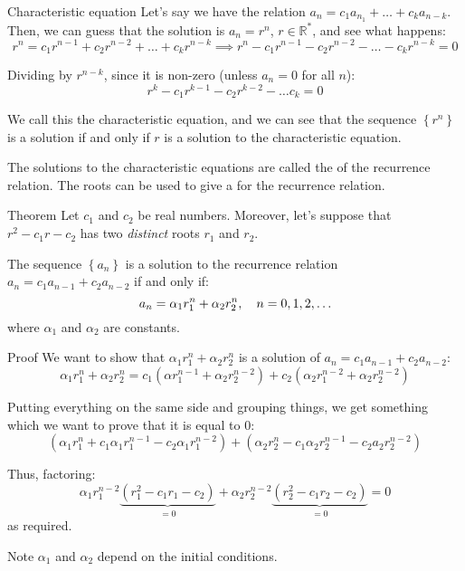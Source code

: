 \documentclass[a4paper]{article}
\begin{document}
\begin{parag}{Characteristic equation}
    Let's say we have the relation $a_n = c_1 a_{n_1} + \ldots + c_k a_{n-k}$. Then, we can guess that the solution is $a_n = r^{n}$, $r \in \mathbb{R}^*$, and see what happens: 
    \[r^{n} = c_1 r^{n-1} + c_2 r^{n-2} + \ldots + c_k r^{n-k} \implies r^{n} - c_1 r^{n-1} - c_2 r^{n-2} - \ldots - c_k r^{n-k} = 0\]

    Dividing by $r^{n-k}$, since it is non-zero (unless $a_n = 0$ for all $n$): 
    \[r^k - c_1 r^{k-1} - c_2 r^{k-2} - \ldots c_k = 0\]

    We call this the characteristic equation, and we can see that the sequence $\left\{r^{n}\right\}$ is a solution if and only if $r$ is a solution to the characteristic equation. 

    The solutions to the characteristic equations are called the  of the recurrence relation. The roots can be used to give a  for the recurrence relation.
\end{parag}

\begin{parag}{Theorem}
    Let $c_1$ and $c_2$ be real numbers. Moreover, let's suppose that $r^2 - c_1r - c_2$ has two \textit{distinct} roots $r_1$ and $r_2$.

    The sequence $\left\{a_n\right\}$ is a solution to the recurrence relation $a_n = c_1 a_{n-1} + c_2 a_{n-2}$ if and only if: 
    \[a_n = \alpha_1 r_1^{n} + \alpha_2 r_2^{n}, \quad n = 0, 1, 2, \ldots\]
    where $\alpha_1$ and $\alpha_2$ are constants.

    \begin{subparag}{Proof}
        We want to show that $\alpha_1 r_1^n + \alpha_2 r_2^n$ is a solution of $a_n = c_1 a_{n-1} + c_2 a_{n-2}$: 
        \[\alpha_1 r_1^{n} + \alpha_2 r_2^{n} = c_1 \left(\alpha r_1^{n-1} + \alpha_2 r_2^{n-2}\right) + c_2\left(\alpha_2 r_1^{n-2} + \alpha_2 r_2^{n-2}\right)\]
        
        Putting everything on the same side and grouping things, we get something which we want to prove that it is equal to 0:
        \[\left(\alpha_1 r_1^{n} + c_1 \alpha_1 r_1^{n-1} - c_2 \alpha_1 r_1^{n-2}\right) + \left(\alpha_2 r_2^{n} - c_1 \alpha_2 r_2^{n-1} - c_2 a_2 r_2^{n-2}\right)\]
        
        Thus, factoring: 
        \[\alpha_1 r_1^{n-2} \underbrace{\left(r_1^2 - c_1 r_1 - c_2\right)}_{=0} + \alpha_2 r_2^{n-2}\underbrace{\left(r_2^2 - c_1 r_2 - c_2\right)}_{=0} = 0\]
        as required.
    \end{subparag}

    \begin{subparag}{Note}
        $\alpha_1$ and $\alpha_2$ depend on the initial conditions.
    \end{subparag}
    
\end{parag}
\end{document}
